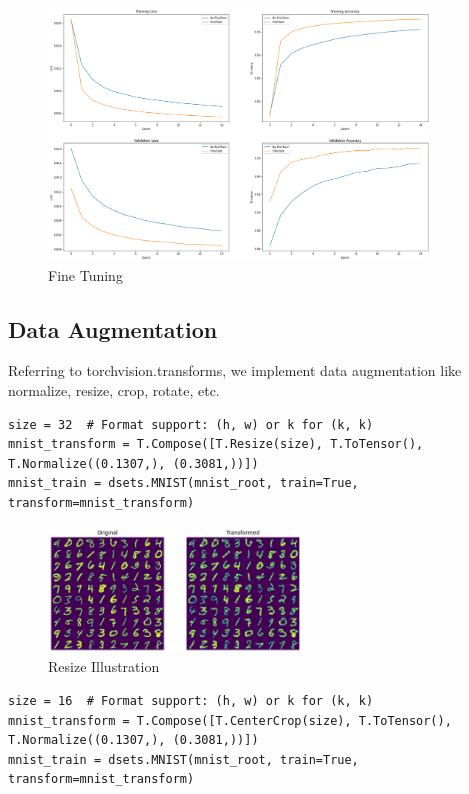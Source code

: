 \documentclass[a4paper, 11pt]{article} %
\begin{document}
\begin{figure}[H]
    \centering
    \includegraphics[width=0.9\textwidth]{./img/finetuning.png}
    \caption{Fine Tuning}
\end{figure}

\subsection{\textbf{Data Augmentation}}

Referring to torchvision.transforms, we implement data augmentation like normalize, resize,
crop, rotate, etc.

\begin{lstlisting}
size = 32  # Format support: (h, w) or k for (k, k)
mnist_transform = T.Compose([T.Resize(size), T.ToTensor(), T.Normalize((0.1307,), (0.3081,))])
mnist_train = dsets.MNIST(mnist_root, train=True, transform=mnist_transform)
\end{lstlisting}

\begin{figure}[H]
    \centering
    \includegraphics[width=0.6\textwidth]{./img/resize.png}
    \caption{Resize Illustration}
\end{figure}

\begin{lstlisting}
size = 16  # Format support: (h, w) or k for (k, k)
mnist_transform = T.Compose([T.CenterCrop(size), T.ToTensor(), T.Normalize((0.1307,), (0.3081,))])
mnist_train = dsets.MNIST(mnist_root, train=True, transform=mnist_transform)
\end{lstlisting}
\end{document}
